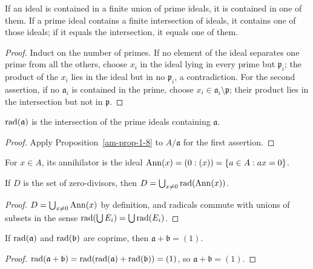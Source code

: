 \begin{proposition}
\label{am-prop-1-11}
\uses{}
If an ideal is contained in a finite union of prime ideals, it is contained in
one of them.  If a prime ideal contains a finite intersection of ideals, it
contains one of those ideals; if it equals the intersection, it equals one of
them.
\end{proposition}
\begin{proof}
Induct on the number of primes.  If no element of the ideal separates one
prime from all the others, choose $x_i$ in the ideal lying in every prime but
$\mathfrak{p}_i$; the product of the $x_i$ lies in the ideal but in no $\mathfrak{p}_i$, a
contradiction.  For the second assertion, if no $\mathfrak{a}_i$ is contained in
the prime, choose $x_i\in\mathfrak{a}_i\setminus\mathfrak{p}$; their product lies in the
intersection but not in $\mathfrak{p}$.
\end{proof}
\begin{proposition}
\label{am-prop-1-14}
\uses{}
$\operatorname{rad}(\mathfrak{a})$ is the intersection of the prime ideals containing $\mathfrak{a}$.
\end{proposition}
\begin{proof}
Apply Proposition~\ref{am-prop-1-8} to $A/\mathfrak{a}$ for the first assertion.
\end{proof}
\begin{definition}
\label{am-def-ann-element}
\uses{}
For $x\in A$, its annihilator is the ideal
$\operatorname{Ann}(x)=(0:(x))=\{a\in A:ax=0\}$.
\end{definition}
\begin{proposition}
\label{am-prop-1-15}
\uses{}
If $D$ is the set of zero-divisors, then
$D=\bigcup_{x\ne0}\operatorname{rad}(\operatorname{Ann}(x))$.
\end{proposition}
\begin{proof}
$D=\bigcup_{x\ne0}\operatorname{Ann}(x)$ by definition, and radicals commute with unions
of subsets in the sense $\operatorname{rad}(\bigcup E_i)=\bigcup\operatorname{rad}(E_i)$.
\end{proof}
\begin{proposition}
\label{am-prop-1-16}
\uses{}
If $\operatorname{rad}(\mathfrak{a})$ and $\operatorname{rad}(\mathfrak{b})$ are coprime, then
$\mathfrak{a}+\mathfrak{b}=(1)$.
\end{proposition}
\begin{proof}
$\operatorname{rad}(\mathfrak{a}+\mathfrak{b})=\operatorname{rad}(\operatorname{rad}(\mathfrak{a})+\operatorname{rad}(\mathfrak{b}))=(1)$, so
$\mathfrak{a}+\mathfrak{b}=(1)$.
\end{proof}

